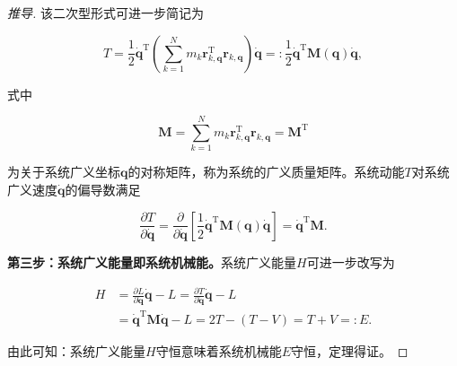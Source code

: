 \begin{proof}[推导]
该二次型形式可进一步简记为

\[
T = \frac{1}{2}\dot{\boldsymbol{q}}^{\mathrm{T}}\left(\sum_{k=1}^{N}m_k\boldsymbol{r}_{k,\boldsymbol{q}}^{\mathrm{T}}\boldsymbol{r}_{k,\boldsymbol{q}}\right)\dot{\boldsymbol{q}} =: \frac{1}{2}\dot{\boldsymbol{q}}^{\mathrm{T}}\boldsymbol{M}(\boldsymbol{q})\dot{\boldsymbol{q}},
\]

式中

\[
\boldsymbol{M} = \sum_{k=1}^{N}m_k\boldsymbol{r}_{k,\boldsymbol{q}}^{\mathrm{T}}\boldsymbol{r}_{k,\boldsymbol{q}} = \boldsymbol{M}^{\mathrm{T}}
\]

为关于系统广义坐标$\boldsymbol{q}$的对称矩阵，称为系统的广义质量矩阵。系统动能$T$对系统广义速度$\dot{\boldsymbol{q}}$的偏导数满足

\[
\frac{\partial T}{\partial \dot{\boldsymbol{q}}} = \frac{\partial}{\partial \dot{\boldsymbol{q}}}\left[\frac{1}{2}\dot{\boldsymbol{q}}^{\mathrm{T}}\boldsymbol{M}(\boldsymbol{q})\dot{\boldsymbol{q}}\right] = \dot{\boldsymbol{q}}^{\mathrm{T}}\boldsymbol{M}.
\]

\textbf{第三步：系统广义能量即系统机械能。}系统广义能量$H$可进一步改写为

\[
\begin{aligned}
H &= \frac{\partial L}{\partial \dot{\boldsymbol{q}}}\dot{\boldsymbol{q}} - L = \frac{\partial T}{\partial \dot{\boldsymbol{q}}}\dot{\boldsymbol{q}} - L \\
&= \dot{\boldsymbol{q}}^{\mathrm{T}}\boldsymbol{M}\dot{\boldsymbol{q}} - L = 2T - (T - V) = T + V =: E.
\end{aligned}
\]

由此可知：系统广义能量$H$守恒意味着系统机械能$E$守恒，定理得证。
\end{proof}
